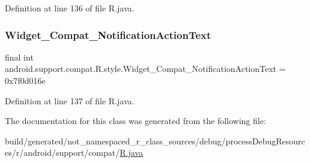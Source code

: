 Definition at line 136 of file R.\+java.

\mbox{\label{classandroid_1_1support_1_1compat_1_1_r_1_1style_a96ff4cd097ce36adea6f4badafde3416}} 
\subsubsection{\texorpdfstring{Widget\_Compat\_NotificationActionText}{Widget\_Compat\_NotificationActionText}}
{\footnotesize\ttfamily final int android.\+support.\+compat.\+R.\+style.\+Widget\+\_\+\+Compat\+\_\+\+Notification\+Action\+Text = 0x7f0d016e\hspace{0.3cm}{\ttfamily [static]}}



Definition at line 137 of file R.\+java.



The documentation for this class was generated from the following file\+:\begin{DoxyCompactItemize}
\item 
build/generated/not\+\_\+namespaced\+\_\+r\+\_\+class\+\_\+sources/debug/process\+Debug\+Resources/r/android/support/compat/\mbox{\hyperlink{android_2support_2compat_2_r_8java}{R.\+java}}\end{DoxyCompactItemize}
